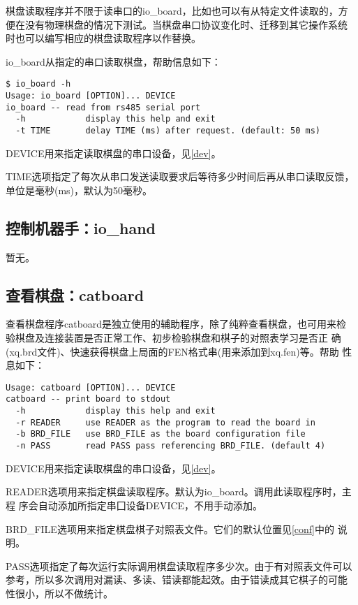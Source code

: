 \documentclass[a4paper]{article}
\begin{document}
棋盘读取程序并不限于读串口的io\_board，比如也可以有从特定文件读取的，方
便在没有物理棋盘的情况下测试。当棋盘串口协议变化时、迁移到其它操作系统
时也可以编写相应的棋盘读取程序以作替换。

io\_board从指定的串口读取棋盘，帮助信息如下：
\begin{verbatim}
$ io_board -h
Usage: io_board [OPTION]... DEVICE
io_board -- read from rs485 serial port
  -h            display this help and exit
  -t TIME       delay TIME (ms) after request. (default: 50 ms)
\end{verbatim}

DEVICE用来指定读取棋盘的串口设备，见\ref{dev}。

TIME选项指定了每次从串口发送读取要求后等待多少时间后再从串口读取反馈，
单位是毫秒(ms)，默认为50毫秒。

\subsection{控制机器手：io\_hand}

暂无。

\subsection{查看棋盘：catboard}

查看棋盘程序catboard是独立使用的辅助程序，除了纯粹查看棋盘，也可用来检
验棋盘及连接装置是否正常工作、初步检验棋盘和棋子的对照表学习是否正
确(xq.brd文件)、快速获得棋盘上局面的FEN格式串(用来添加到xq.fen)等。帮助
性息如下：
\begin{verbatim}
Usage: catboard [OPTION]... DEVICE
catboard -- print board to stdout
  -h            display this help and exit
  -r READER     use READER as the program to read the board in
  -b BRD_FILE   use BRD_FILE as the board configuration file
  -n PASS       read PASS pass referencing BRD_FILE. (default 4)
\end{verbatim}

DEVICE用来指定读取棋盘的串口设备，见\ref{dev}。

READER选项用来指定棋盘读取程序。默认为io\_board。调用此读取程序时，主程
序会自动添加所指定串囗设备DEVICE，不用手动添加。

BRD\_FILE选项用来指定棋盘棋子对照表文件。它们的默认位置见\ref{conf}中的
说明。

PASS选项指定了每次运行实际调用棋盘读取程序多少次。由于有对照表文件可以
参考，所以多次调用对漏读、多读、错读都能起效。由于错读成其它棋子的可能
性很小，所以不做统计。
\end{document}

